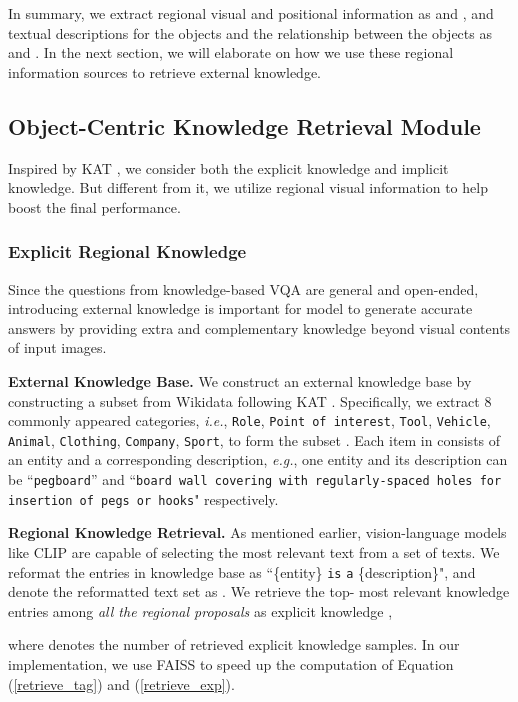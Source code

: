 \documentclass{article}
\begin{document}
In summary, we extract regional visual and positional information as  and , and textual descriptions for the objects and the relationship between the objects as  and . In the next section, we will elaborate on how we use these regional information sources to retrieve external knowledge.

\subsection{Object-Centric Knowledge Retrieval Module}
\label{knowledge_module}

Inspired by KAT \cite{gui2021kat}, we consider both the explicit knowledge and implicit knowledge. But different from it, we utilize regional visual information to help boost the final performance.

\subsubsection{Explicit Regional Knowledge}
Since the questions from knowledge-based VQA \cite{marino2019ok} are general and open-ended, introducing external knowledge is important for model to generate accurate answers by providing extra and complementary knowledge beyond visual contents of input images.

\textbf{External Knowledge Base. } We construct an external knowledge base  by constructing a subset from Wikidata \cite{vrandevcic2014wikidata} following KAT \cite{gui2021kat}. Specifically, we extract 8 commonly appeared categories, \textit{i.e.},  \texttt{Role}, \texttt{Point of interest}, \texttt{Tool}, \texttt{Vehicle}, \texttt{Animal}, \texttt{Clothing}, \texttt{Company}, \texttt{Sport}, to form the subset . Each item in  consists of an entity and a corresponding description, \textit{e.g.}, one entity and its description can be ``\texttt{pegboard}'' and ``\texttt{board wall covering with regularly-spaced holes for insertion of pegs or hooks}" respectively. 

\textbf{Regional Knowledge Retrieval. } 
As mentioned earlier, vision-language models like CLIP are capable of selecting the most relevant text from a set of texts. We reformat the entries in knowledge base  as ``\{entity\} \texttt{is} \texttt{a} \{description\}", and denote the reformatted text set as . 
We retrieve the top- most relevant knowledge entries among \emph{all the regional proposals} as explicit knowledge ,  

where  denotes the number of retrieved explicit knowledge samples. In our implementation, we use FAISS \cite{johnson2019billion} to speed up the computation of Equation (\ref{retrieve_tag}) and (\ref{retrieve_exp}).
\end{document}
